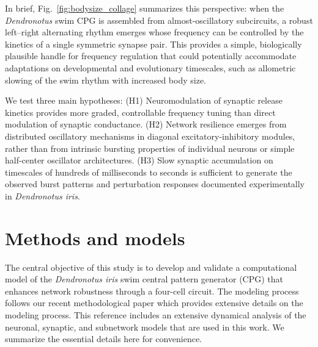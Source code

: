 \documentclass[nofootinbib,aip,amsmath,amssymb,preprint,twocolumn,floatfix,10pt]{revtex4-2}
\begin{document}
In brief, Fig.~\ref{fig:bodysize_collage} summarizes this perspective: when the \textit{Dendronotus} swim CPG is assembled from almost-oscillatory subcircuits, a robust left–right alternating rhythm emerges whose frequency can be controlled by the kinetics of a single symmetric synapse pair. This provides a simple, biologically plausible handle for frequency regulation that could potentially accommodate adaptations on developmental and evolutionary timescales, such as allometric slowing of the swim rhythm with increased body size.

We test three main hypotheses: (H1) Neuromodulation of synaptic release kinetics provides more graded, controllable frequency tuning than direct modulation of synaptic conductance. (H2) Network resilience emerges from distributed oscillatory mechanisms in diagonal excitatory-inhibitory modules, rather than from intrinsic bursting properties of individual neurons or simple half-center oscillator architectures. (H3) Slow synaptic accumulation on timescales of hundreds of milliseconds to seconds is sufficient to generate the observed burst patterns and perturbation responses documented experimentally in \textit{Dendronotus iris}.

\section{Methods and models}
%
The central objective of this study is to develop and validate a computational model of the \textit{Dendronotus iris} swim central pattern generator (CPG) that enhances network robustness through a four-cell circuit.
The modeling process follows our recent methodological paper \cite{scully2024pairing} which provides extensive details on the modeling process.
This reference includes an extensive dynamical analysis of the neuronal, synaptic, and subnetwork models that are used in this work. We summarize the essential details here for convenience.
\end{document}
